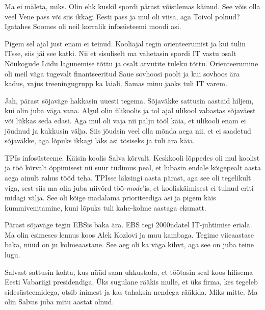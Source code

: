 
Ma ei mäleta, miks. Olin ehk kuskil spordi pärast 
võistlemas käinud. See võis olla veel 
Vene pass või siis ikkagi Eesti pass ja mul oli viisa, aga Toivol polnud? 
Igatahes Soomes oli neil 
korralik infosüsteemi moodi asi. 


Pigem sel ajal just enam ei teinud. Kooliajal tegin
orienteerumist ja kui tulin ITsse, siis jäi see katki. Nii et sisuliselt ma 
vahetasin spordi IT vastu osalt Nõukogude Liidu lagunemise tõttu ja osalt
arvutite tuleku tõttu. Orienteerumine oli meil väga tugevalt finantseeritud Saue 
sovhoosi poolt ja kui sovhoos ära kadus, vajus treeningugrupp ka laiali. Samas minu 
jaoks tuli IT varem.


Jah, pärast sõjaväge hakkasin uuesti tegema. Sõjaväkke sattusin aastaid 
hiljem, kui olin juba väga vana. Algul olin ülikoolis ja tol ajal 
ülikool vabastas sõjaväest või lükkas seda edasi. Aga mul oli vaja nii palju tööl käia, 
et ülikooli enam ei jõudnud ja kukkusin välja. Siis 
jõudsin veel olla mõnda aega nii, et ei saadetud sõjaväkke, aga lõpuks ikkagi 
läks asi tõsiseks ja tuli ära käia. 


TPIs infosüsteeme. 
Käisin koolis Salva kõrvalt. Keskkooli lõppedes oli mul koolist ja 
töö kõrvalt õppimisest nii suur tüdimus peal, et lubasin endale
kõigepealt aasta aega ainult rahus tööd teha. TPIsse läksingi aasta pärast, aga see oli tegelikult viga, sest siis ma 
olin juba niivõrd töö-\emph{mode}'is, et kooliskäimisest ei tulnud eriti midagi välja. See oli kõige madalama 
prioriteediga asi ja pigem käis kummivenitamine, kuni lõpuks tuli kahe-kolme aastaga eksmatt. 

Pärast sõjaväge tegin EBSis baka ära. EBS tegi 2000ndatel IT-juhtimise 
eriala. Ma olin esimeses lennus 
koos Alek Kozlovi ja muu kambaga. Tegime 
viieaastase baka, nüüd on ju kolmeaastane. See aeg oli 
ka väga kihvt, aga see on juba teine lugu. 


Salvast sattusin kohta, kus nüüd saan uhkustada, et töötasin seal 
koos hilisema Eesti Vabariigi presidendiga. Üks sugulane 
rääkis mulle, et üks firma, kes tegeleb sidesüsteemidega, otsib 
inimest ja kas tahaksin nendega rääkida. Miks mitte. Ma olin Salvas juba mitu aastat olnud. 

